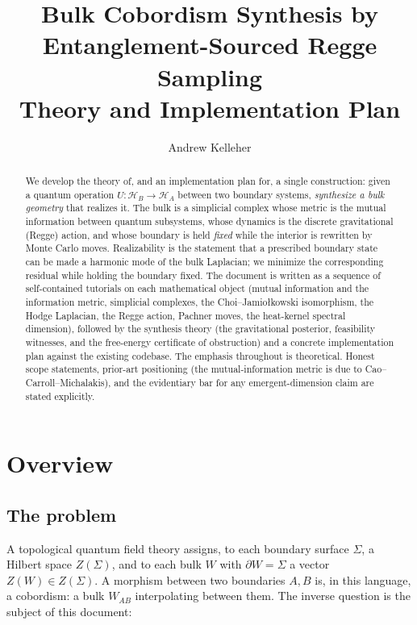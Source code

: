 \documentclass[11pt]{article}
\title{\bfseries Bulk Cobordism Synthesis by\\ Entanglement-Sourced Regge Sampling\\[4pt]
\large Theory and Implementation Plan}
\author{Andrew Kelleher}
\date{}
\newcommand{\HH}{\mathcal{H}}
\newcommand{\bd}{\partial}
\theoremstyle{definition}
\theoremstyle{plain}
\begin{document}
\maketitle

\begin{abstract}
\noindent
We develop the theory of, and an implementation plan for, a single construction:
given a quantum operation $U:\HH_B\to\HH_A$ between two boundary systems, \emph{synthesize a
bulk geometry} that realizes it. The bulk is a simplicial complex whose metric is the
mutual information between quantum subsystems, whose dynamics is the discrete
gravitational (Regge) action, and whose boundary is held \emph{fixed} while the interior
is rewritten by Monte Carlo moves. Realizability is the statement that a prescribed
boundary state can be made a harmonic mode of the bulk Laplacian; we minimize the
corresponding residual while holding the boundary fixed. The document is written as a
sequence of self-contained tutorials on each mathematical object (mutual information and
the information metric, simplicial complexes, the Choi--Jamio\l{}kowski isomorphism, the
Hodge Laplacian, the Regge action, Pachner moves, the heat-kernel spectral dimension),
followed by the synthesis theory (the gravitational posterior, feasibility witnesses, and
the free-energy certificate of obstruction) and a concrete implementation plan against the
existing codebase. The emphasis throughout is theoretical. Honest scope statements,
prior-art positioning (the mutual-information metric is due to Cao--Carroll--Michalakis),
and the evidentiary bar for any emergent-dimension claim are stated explicitly.
\end{abstract}

\tableofcontents

\section{Overview}
\label{sec:overview}

\subsection{The problem}

A topological quantum field theory assigns, to each boundary surface $\Sigma$, a Hilbert
space $Z(\Sigma)$, and to each bulk $W$ with $\bd W = \Sigma$ a vector $Z(W)\in
Z(\Sigma)$. A morphism between two boundaries $A,B$ is, in this language, a cobordism: a
bulk $W_{AB}$ interpolating between them. The inverse question is the subject of this
document:
\end{document}
